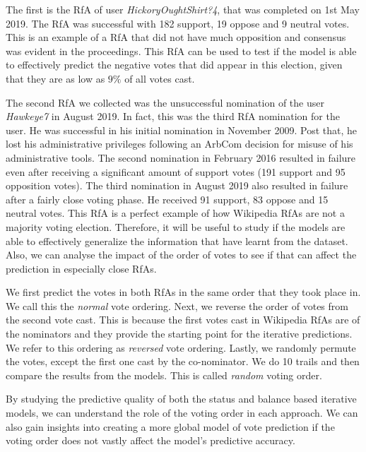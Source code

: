 The first is the RfA of user \textit{HickoryOughtShirt?4}, that was completed on 1st May 2019.
The RfA was successful with 182 support, 19 oppose and 9 neutral votes.
This is an example of a RfA that did not have much opposition and consensus was evident in the proceedings.
This RfA can be used to test if the model is able to effectively predict the negative votes that did appear in this election, given that they are as low as $9\%$ of all votes cast.

The second RfA we collected was the unsuccessful nomination of the user \textit{Hawkeye7} in August 2019.
In fact, this was the third RfA nomination for the user.
He was successful in his initial nomination in November 2009.
Post that, he lost his administrative privileges following an ArbCom decision for misuse of his administrative tools.
The second nomination in February 2016 resulted in failure even after receiving a significant amount of support votes (191 support and 95 opposition votes).
The third nomination in August 2019 also resulted in failure after a fairly close voting phase.
He received 91 support, 83 oppose and 15 neutral votes.
This RfA is a perfect example of how Wikipedia RfAs are not a majority voting election.
Therefore, it will be useful to study if the models are able to effectively generalize the information that have learnt from the \wikirfa dataset.
Also, we can analyse the impact of the order of votes to see if that can affect the prediction in especially close RfAs.

We first predict the votes in both RfAs in the same order that they took place in.
We call this the \textit{normal} vote ordering.
Next, we reverse the order of votes from the second vote cast.
This is because the first votes cast in Wikipedia RfAs are of the nominators and they provide the starting point for the iterative predictions.
We refer to this ordering as \textit{reversed} vote ordering.
Lastly, we randomly permute the votes, except the first one cast by the co-nominator.
We do 10 trails and then compare the results from the models.
This is called \textit{random} voting order.

By studying the predictive quality of both the status and balance based iterative models, we can understand the role of the voting order in each approach.
We can also gain insights into creating a more global model of vote prediction if the voting order does not vastly affect the model's predictive accuracy.


